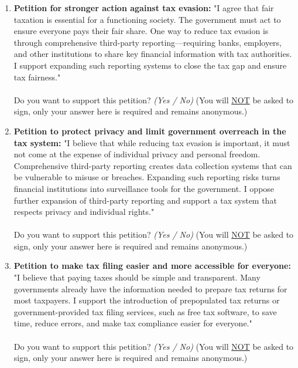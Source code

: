 \documentclass[11pt]{article}
\begin{document}
\begin{enumerate}[resume]
    \begin{enumerate}[label=\alph*)]
        \item \textbf{Petition for stronger action against tax evasion:} "I agree that fair taxation is essential for a functioning society. The government must act to ensure everyone pays their fair share. One way to reduce tax evasion is through comprehensive third-party reporting---requiring banks, employers, and other institutions to share key financial information with tax authorities. I support expanding such reporting systems to close the tax gap and ensure tax fairness." \\ \\
        Do you want to support this petition? \textit{(Yes / No)} (You will \underline{NOT} be asked to sign, only your answer here is required and remains anonymous.)\\
        \item \textbf{Petition to protect privacy and limit government overreach in the tax system:} "I believe that while reducing tax evasion is important, it must not come at the expense of individual privacy and personal freedom. Comprehensive third-party reporting creates data collection systems that can be vulnerable to misuse or breaches. Expanding such reporting risks turns financial institutions into surveillance tools for the government. I oppose further expansion of third-party reporting and support a tax system that respects privacy and individual rights."\\ \\
        Do you want to support this petition? \textit{(Yes / No)} (You will \underline{NOT} be asked to sign, only your answer here is required and remains anonymous.) \\
        \item \textbf{Petition to make tax filing easier and more accessible for everyone:} "I believe that paying taxes should be simple and transparent. Many governments already have the information needed to prepare tax returns for most taxpayers. I support the introduction of prepopulated tax returns or government-provided tax filing services, such as free tax software, to save time, reduce errors, and make tax compliance easier for everyone."\\ \\
        Do you want to support this petition? \textit{(Yes / No)} (You will \underline{NOT} be asked to sign, only your answer here is required and remains anonymous.)
    \end{enumerate}
\end{enumerate}   
\end{document}
